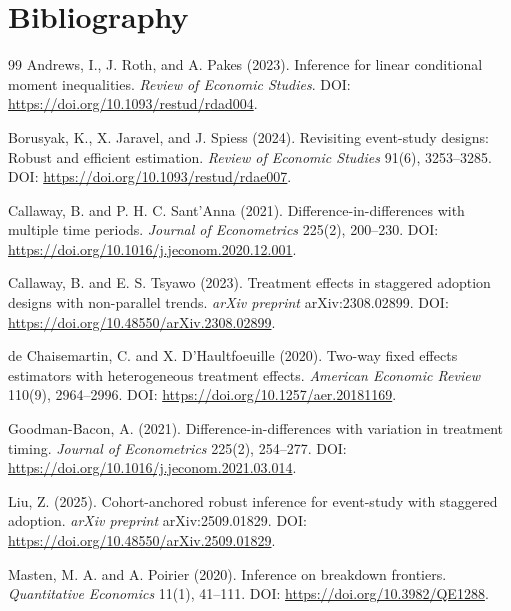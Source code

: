 \documentclass[11pt]{article}
\theoremstyle{definition}
\theoremstyle{plain}
\theoremstyle{remark}
\begin{document}
\section*{Bibliography}
\begin{thebibliography}{99}
Andrews, I., J. Roth, and A. Pakes (2023).
\newblock Inference for linear conditional moment inequalities.
\newblock \emph{Review of Economic Studies}. DOI: \url{https://doi.org/10.1093/restud/rdad004}.

Borusyak, K., X. Jaravel, and J. Spiess (2024).
\newblock Revisiting event-study designs: Robust and efficient estimation.
\newblock \emph{Review of Economic Studies} 91(6), 3253--3285. DOI: \url{https://doi.org/10.1093/restud/rdae007}.

Callaway, B. and P. H. C. Sant'Anna (2021).
\newblock Difference-in-differences with multiple time periods.
\newblock \emph{Journal of Econometrics} 225(2), 200--230. DOI: \url{https://doi.org/10.1016/j.jeconom.2020.12.001}.

Callaway, B. and E. S. Tsyawo (2023).
\newblock Treatment effects in staggered adoption designs with non-parallel trends.
\newblock \emph{arXiv preprint} arXiv:2308.02899. DOI: \url{https://doi.org/10.48550/arXiv.2308.02899}.

de Chaisemartin, C. and X. D'Haultfoeuille (2020).
\newblock Two-way fixed effects estimators with heterogeneous treatment effects.
\newblock \emph{American Economic Review} 110(9), 2964--2996. DOI: \url{https://doi.org/10.1257/aer.20181169}.

Goodman-Bacon, A. (2021).
\newblock Difference-in-differences with variation in treatment timing.
\newblock \emph{Journal of Econometrics} 225(2), 254--277. DOI: \url{https://doi.org/10.1016/j.jeconom.2021.03.014}.

Liu, Z. (2025).
\newblock Cohort-anchored robust inference for event-study with staggered adoption.
\newblock \emph{arXiv preprint} arXiv:2509.01829. DOI: \url{https://doi.org/10.48550/arXiv.2509.01829}.

Masten, M. A. and A. Poirier (2020).
\newblock Inference on breakdown frontiers.
\newblock \emph{Quantitative Economics} 11(1), 41--111. DOI: \url{https://doi.org/10.3982/QE1288}.


\end{thebibliography}
\end{document}
